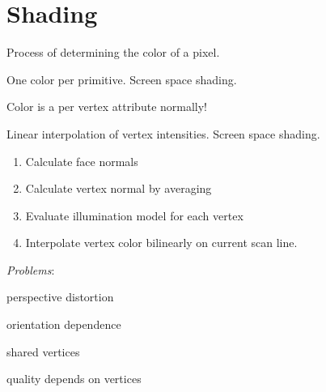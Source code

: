 \section{Shading}

\begin{definition}[Shading]
  Process of determining the color of a pixel.
\end{definition}

\begin{definition}
  One color per primitive. Screen space shading.
\end{definition}

\begin{theorem}
  Color is a per vertex attribute normally!
\end{theorem}

\begin{algorithm}
  Linear interpolation of vertex intensities. Screen space shading.
  \begin{enumerate}
    \item Calculate face normals
    \item Calculate vertex normal by averaging
    \item Evaluate illumination model for each vertex
    \item Interpolate vertex color bilinearly on current scan line.
  \end{enumerate}

  \textit{Problems}:
  \begin{itemize*}
    \item perspective distortion
    \item orientation dependence
    \item shared vertices
    \item quality depends on vertices
  \end{itemize*}
\end{algorithm}


